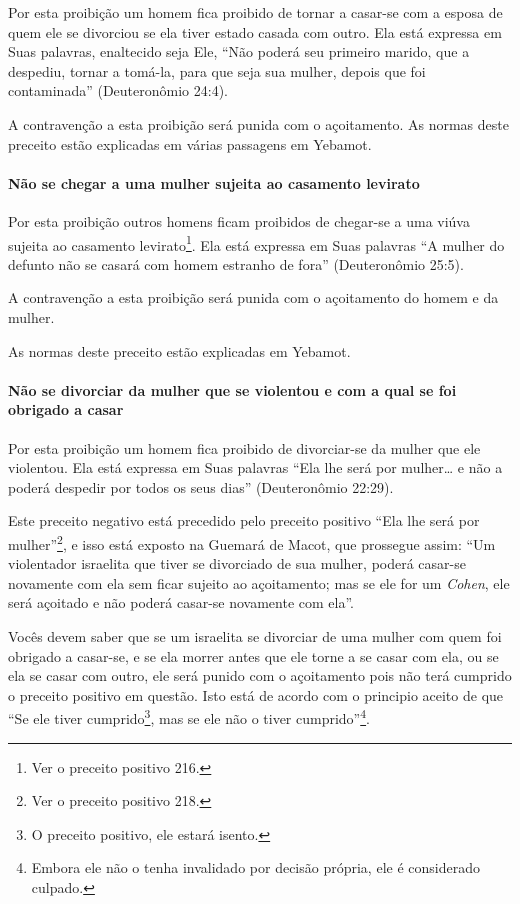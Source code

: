Por esta proibição um homem fica proibido de tornar a casar-se com a
esposa de quem ele se divorciou se ela tiver estado casada com outro.
Ela está expressa em Suas palavras, enaltecido seja Ele, ``Não poderá
seu primeiro marido, que a despediu, tornar a tomá-la, para que seja sua
mulher, depois que foi contaminada'' (Deuteronômio 24:4).

A contravenção a esta proibição será punida com o açoitamento. As normas
deste preceito estão explicadas em várias passagens em Yebamot.

\paragraph{Não se chegar a uma mulher sujeita ao casamento levirato}

Por esta proibição outros homens ficam proibidos de chegar-se a uma
viúva sujeita ao casamento levirato\footnote{Ver o preceito positivo 216.}. Ela está
expressa em Suas palavras ``A mulher do defunto não se casará com homem
estranho de fora'' (Deuteronômio 25:5).

A contravenção a esta proibição será punida com o açoitamento do homem e
da mulher.

As normas deste preceito estão explicadas em Yebamot.

\paragraph{Não se divorciar da mulher que se violentou e com a qual se foi obrigado a casar}

Por esta proibição um homem fica proibido de divorciar-se da mulher que
ele violentou. Ela está expressa em Suas palavras ``Ela lhe será por
mulher\ldots{} e não a poderá despedir por todos os seus dias''
(Deuteronômio 22:29).

Este preceito negativo está precedido pelo preceito positivo ``Ela lhe
será por mulher''\footnote{Ver o preceito positivo 218.}, e isso está exposto na Guemará
de Macot, que prossegue assim: ``Um violentador israelita que tiver se
divorciado de sua mulher, poderá casar-se novamente com ela sem ficar
sujeito ao açoitamento; mas se ele for um \textit{Cohen}, ele será açoitado e
não poderá casar-se novamente com ela''.

Vocês devem saber que se um israelita se divorciar de uma mulher com
quem foi obrigado a casar-se, e se ela morrer antes que ele torne a se
casar com ela, ou se ela se casar com outro, ele será punido com o
açoitamento pois não terá cumprido o preceito positivo em questão. Isto
está de acordo com o principio aceito de que ``Se ele tiver
cumprido\footnote{O preceito positivo, ele estará isento.}, mas se ele não o tiver
cumprido''\footnote{Embora ele não o tenha invalidado por decisão própria, ele é
  considerado culpado.}.

